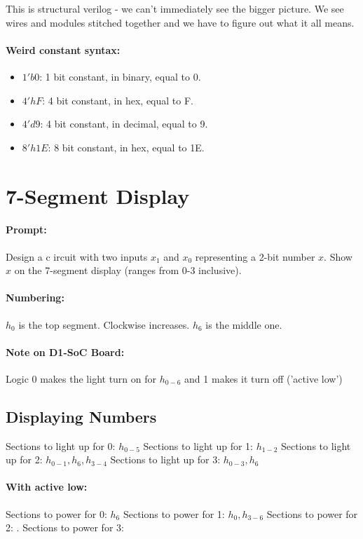 \documentclass[a4paper,12pt]{report}
\begin{document}
This is structural verilog - we can't immediately see the bigger picture. We see wires and 
modules stitched together and we have to figure out what it all means.

\paragraph{Weird constant syntax: }
\begin{itemize}
\item $1'b0$: 1 bit constant, in binary, equal to 0.
\item $4'hF$: 4 bit constant, in hex, equal to F.
\item $4'd9$: 4 bit constant, in decimal, equal to 9.
\item $8'h1E$: 8 bit constant, in hex, equal to 1E.
\end{itemize}

\section{7-Segment Display}
\paragraph{Prompt: } Design a c ircuit with two inputs $x_1$ and $x_0$ representing a 
2-bit number $x$. Show $x$ on the 7-segment display (ranges from 0-3 inclusive).

\paragraph{Numbering: } $h_0$ is the top segment. Clockwise increases. $h_6$ is the middle one.

\paragraph{Note on D1-SoC Board: } Logic 0 makes the light turn on for $h_{0-6}$ and 1 makes 
it turn off ('active low')

\subsection{Displaying Numbers}
Sections to light up for 0: $h_{0-5}$
Sections to light up for 1: $h_{1-2}$
Sections to light up for 2: $h_{0-1}, h_6, h_{3-4}$
Sections to light up for 3: $h_{0-3}, h_6$

\paragraph{With active low: }
Sections to power for 0: $h_{6}$
Sections to power for 1: $h_{0}, h_{3-6}$
Sections to power for 2: $.$
Sections to power for 3: 
\end{document}
